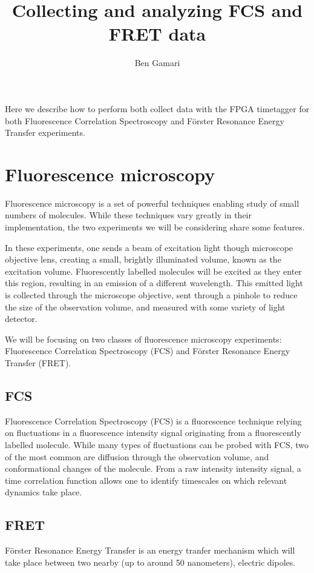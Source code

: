 \documentclass{article}
\title{Collecting and analyzing FCS and FRET data}
\author{Ben Gamari}
\begin{document}
\maketitle

Here we describe how to perform both collect data with the FPGA
timetagger for both Fluorescence Correlation Spectroscopy and
F\"orster Resonance Energy Transfer experiments.

\section{Fluorescence microscopy}
Fluorescence microscopy is a set of powerful techniques enabling study
of small numbers of molecules. While these techniques vary greatly in
their implementation, the two experiments we will be considering share
some features.

In these experiments, one sends a beam of excitation light though
microscope objective lens, creating a small, brightly illuminated
volume, known as the excitation volume. Fluorescently labelled
molecules will be excited as they enter this region, resulting in an
emission of a different wavelength. This emitted light is collected
through the microscope objective, sent through a pinhole to reduce the
size of the observation volume, and measured with some variety of
light detector.

We will be focusing on two classes of fluorescence microscopy
experiments: Fluorescence Correlation Spectroscopy (FCS) and F\"orster
Resonance Energy Transfer (FRET).

\subsection{FCS}
Fluorescence Correlation Spectroscopy (FCS) is a fluorescence
technique relying on fluctuations in a fluorescence intensity
signal originating from a fluorescently labelled molecule. While many
types of fluctuations can be probed with FCS, two of the most common
are diffusion through the observation volume, and conformational
changes of the molecule. From a raw intensity intensity signal, a time
correlation function allows one to identify timescales on which relevant
dynamics take place.

\subsection{FRET}
F\"orster Resonance Energy Transfer is an energy tranfer mechanism
which will take place between two nearby (up to around 50 nanometers),
electric dipoles.
\end{document}
